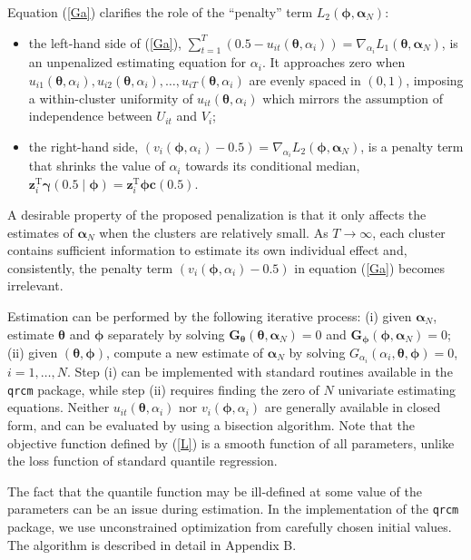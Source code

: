 \documentclass[12pt]{article}
\def\T{{ \mathrm{\scriptscriptstyle T} }}
\def\thetavec{\bm{\theta}}
\def\phivec{\bm{\phi}}
\def\gammavec{\bm{\gamma}}
\def\aa{\bm{\alpha}_N}
\def\zz{\bm{z}}
\def\cvec{\bm{c}}
\def\G{\bm{G}}
\begin{document}
Equation (\ref{Ga}) clarifies the role of the ``penalty'' term $L_2(\phivec, \aa)$: 
\begin{itemize}
\item{the left-hand side of (\ref{Ga}), $\sum_{t = 1}^{T} {(0.5 - u_{it}(\thetavec, \alpha_i))} = \nabla_{\alpha_i}L_1(\thetavec, \aa)$,
is an unpenalized estimating equation for $\alpha_i$. It approaches zero when $u_{i1}(\thetavec, \alpha_i), u_{i2}(\thetavec, \alpha_i), \ldots, u_{iT}(\thetavec, \alpha_i)$ are evenly spaced in $(0,1)$,
imposing a within-cluster uniformity of $u_{it}(\thetavec, \alpha_i)$ which mirrors the assumption of independence between $U_{it}$ and $V_i$;}
\item{the right-hand side, $ (v_i(\phivec, \alpha_i) - 0.5) = \nabla_{\alpha_i}L_2(\phivec, \aa)$, is a penalty term that shrinks 
the value of $\alpha_i$ towards its conditional median, $\zz_{i}^\T\gammavec(0.5 \mid \phivec) = \zz_{i}^\T\phivec\cvec(0.5)$.
}
\end{itemize}
A desirable property of the proposed penalization is that it only affects the estimates of $\aa$ when the clusters are relatively small.
As $T \to \infty$, each cluster contains sufficient information to estimate its own individual effect and,
consistently, the penalty term $(v_i(\phivec, \alpha_i) - 0.5)$ in equation (\ref{Ga}) becomes irrelevant.

Estimation can be performed by the following iterative process: (i) given $\aa$, estimate $\thetavec$
and $\phivec$ separately by solving $\G_{\thetavec}(\thetavec, \aa)=0$ and $\G_{\phivec}(\phivec, \aa)=0$;
(ii) given $(\thetavec, \phivec)$, compute a new estimate of $\aa$ by solving $G_{\alpha_i}(\alpha_i, \thetavec, \phivec) = 0$,
$i = 1, \ldots, N$. Step (i) can be implemented with standard routines available in the \texttt{qrcm} package,
while step (ii) requires finding the zero of $N$ univariate estimating equations. Neither $u_{it}(\thetavec, \alpha_i)$ nor $v_i(\phivec, \alpha_i)$ are generally 
available in closed form, and can be evaluated by using a bisection algorithm. Note that the objective function
defined by (\ref{L}) is a smooth function of all parameters, unlike the loss function of standard quantile regression.


The fact that the quantile function may be ill-defined at some value of the parameters can be an issue 
during estimation. In the implementation of the \texttt{qrcm} package, we use
unconstrained optimization from carefully chosen initial values. 
The algorithm is described in detail in Appendix B.
\end{document}
